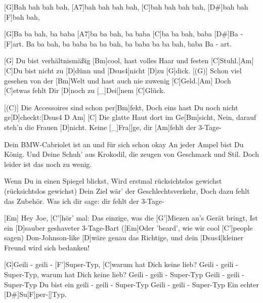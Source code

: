 

\begin{guitar}
	[G]Bah bah bah bah, [A7]bah bah bah bah, [C]bah bah bah bah, [D#]bah bah [F]bah bah,
	
	[G]Ba ba bah, ba baba [A7]ba ba bah, ba baba [C]ba ba bah, baba [D#]Ba - [F]art.
	Ba ba bah, ba baba ba ba bah, ba baba ba ba bah, baba Ba - art.
	
	[G] Du bist verhältnismäßig [Bm]cool, hast volles Haar und festen [C]Stuhl.[Am]{}
	[C]Du bist nicht zu [D]dünn und [{\color{gray}Dsus4}]nicht [{\color{gray}D}]zu [G]dick.
	[(G)] Schon viel gesehen von der [Bm]Welt und hast auch nie zuwenig [C]Geld.[Am]{}
	Doch [C]etwas fehlt Dir [D]noch zu [_]{Dei}[]nem [C]Glück.
	
	[(C)] Die Accessoires sind schon per[Bm]fekt, 
	Doch eins hast Du noch nicht ge[D]checkt:[{\color{gray}Dsus4 D}  Am]{}
	[C] Die glatte Haut dort im Ge[Bm]sicht, 
	Nein, darauf steh'n die Frauen [D]nicht. Keine [_]{Fra}[]ge, dir [Am]fehlt der 3-Tage-
	
	 
	
	Dein BMW-Cabriolet ist an und für sich schon okay
	An jeder Ampel bist Du König.
	Und Deine Schuh' aus Krokodil, die zeugen von Geschmack und Stil.
	Doch leider ist das noch zu wenig.
	
	Wenn Du in einen Spiegel blickst,
	Wird erstmal rücksichtslos gewichst (rücksichtslos gewichst)
	Dein Ziel wär' der Geschlechtsverkehr,
	Doch dazu fehlt das Zubehör. Was ich dir sage: dir fehlt der 3-Tage-
	
	 
	
	[Em] Hey Joe, [C']hör' mal:
	Das einzige, was die [G']Miezen an's Gerät bringt,
	Ist ein [D]sauber geshaveter 3-Tage-Bart
	([Em]Oder 'beard', wie wir cool [C']people sagen)
	Don-Johnson-like [D]wäre genau das Richtige, 
	und dein [Dsus4]kleiner Freund wird sich bedanken!
	
	[G]Geili - geili - [F']Super-Typ, [C]warum hat Dich keine lieb?
	Geili - geili - Super-Typ, warum hat Dich keine lieb?
	Geili - geili - Super-Typ
	Geili - geili - Super-Typ
	Du bist ein geili - geili - Super-Typ
	Geili - geili - Super-Typ
	Ein echter [D#]Su[F]per-[]Typ.
	
\end{guitar}
